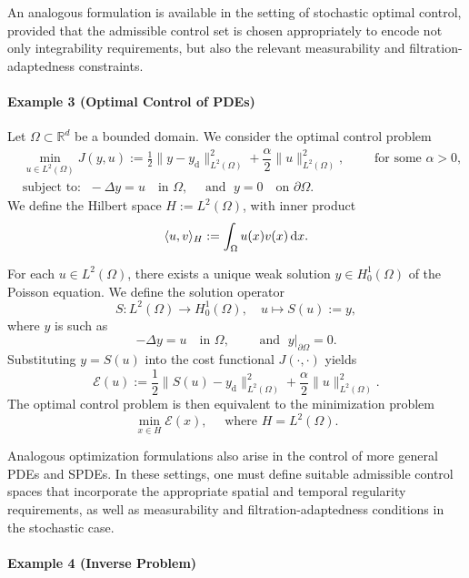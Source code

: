\documentclass[12pt]{amsart}
\newcommand{\D}[1]{\mbox{\rm #1}}
\newcommand{\dd}{\D{d}}
\numberwithin{equation}{section}
\begin{document}
An analogous formulation is available in the setting of stochastic optimal control, provided that the admissible control set is chosen appropriately to encode not only integrability requirements, but also the relevant measurability and filtration-adaptedness constraints.

\paragraph{\textbf{Example 3} (Optimal Control of PDEs)}

Let $\Omega \subset \mathbb{R}^d$ be a bounded domain. We consider the optimal control problem
\begin{equation*}
\begin{aligned}
    & \min\limits_{u \in L^2(\Omega)} J(y,u) := \frac{1}{2}\|y - y_{\text{d}}\|_{L^2(\Omega)}^2 + \dfrac{\alpha}{2}\|u\|_{L^2(\Omega)}^2, \qquad  \text{ for some } \alpha > 0,\\
    & \text{subject to: }\; -\Delta y = u \quad \text{in } \Omega,\quad \text{ and } \; y = 0 \quad \text{on } \partial\Omega.
\end{aligned}
\end{equation*}
We define the Hilbert space $H := L^2(\Omega)$, with inner product
\[
    \langle u,v \rangle_H := \int_\Omega u(x)v(x)\,\dd x.
\]

For each $u \in L^2(\Omega)$, there exists a unique weak solution $y \in H_0^1(\Omega)$ of the Poisson equation. We define the solution operator
\[
    S : L^2(\Omega) \longrightarrow H_0^1(\Omega), \quad u \longmapsto S(u):=y,
\]
where $y$ is such as
\[
    -\Delta y = u \quad \text{in } \Omega, \qquad \text{ and } \; y|_{\partial\Omega} = 0.
\]
Substituting $y = S(u)$ into the cost functional $J(\cdot,\cdot)$ yields
\[
    \mathscr{E}(u) := \frac{1}{2}\|S(u) - y_{\text{d}}\|_{L^2(\Omega)}^2 + \frac{\alpha}{2}\|u\|_{L^2(\Omega)}^2.
\]
The optimal control problem is then equivalent to the minimization problem
\[
    \min_{x \in H} \mathscr{E}(x), \quad \text{ where } H = L^2(\Omega).
\]

Analogous optimization formulations also arise in the control of more general PDEs and SPDEs. In these settings, one must define suitable admissible control spaces that incorporate the appropriate spatial and temporal regularity requirements, as well as measurability and filtration-adaptedness conditions in the stochastic case.


\paragraph{\textbf{Example 4} (Inverse Problem)}
\end{document}
